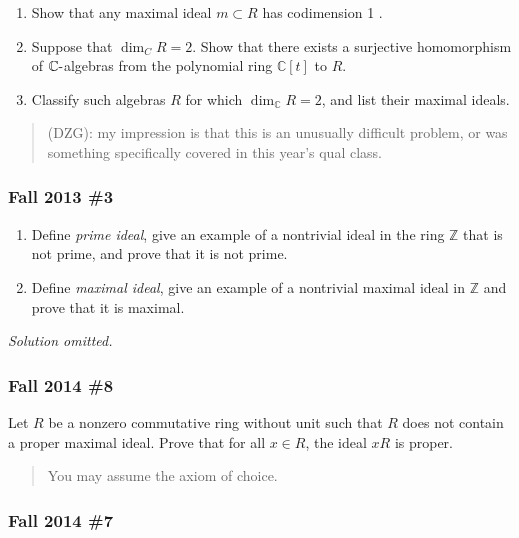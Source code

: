 \begin{enumerate}
\def\labelenumi{\alph{enumi}.}
\item
  Show that any maximal ideal \(m \subset R\) has codimension 1 .
\item
  Suppose that \(\operatorname{dim}_{C} R=2\). Show that there exists a
  surjective homomorphism of \({\mathbb{C}}{\hbox{-}}\)algebras from the
  polynomial ring \({\mathbb{C}}[t]\) to \(R\).
\item
  Classify such algebras \(R\) for which \(\dim_{{\mathbb{C}}} R=2\),
  and list their maximal ideals.
\end{enumerate}

\begin{quote}
(DZG): my impression is that this is an unusually difficult problem, or
was something specifically covered in this year's qual class.
\end{quote}

\hypertarget{fall-2013-3}{%
\subsubsection{Fall 2013 \#3}\label{fall-2013-3}}

\begin{enumerate}
\def\labelenumi{\alph{enumi}.}
\item
  Define \emph{prime ideal}, give an example of a nontrivial ideal in
  the ring \({\mathbb{Z}}\) that is not prime, and prove that it is not
  prime.
\item
  Define \emph{maximal ideal}, give an example of a nontrivial maximal
  ideal in \({\mathbb{Z}}\) and prove that it is maximal.
\end{enumerate}

\emph{Solution omitted.}

\hypertarget{fall-2014-8}{%
\subsubsection{Fall 2014 \#8}\label{fall-2014-8}}

Let \(R\) be a nonzero commutative ring without unit such that \(R\)
does not contain a proper maximal ideal. Prove that for all \(x\in R\),
the ideal \(xR\) is proper.

\begin{quote}
You may assume the axiom of choice.
\end{quote}

\hypertarget{fall-2014-7}{%
\subsubsection{Fall 2014 \#7}\label{fall-2014-7}}

